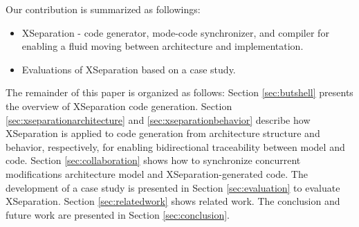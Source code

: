 %

%

%






%


Our contribution is summarized as followings:

\begin{itemize}
	\item XSeparation - code generator, mode-code synchronizer, and compiler for enabling a fluid moving between architecture and implementation.
	
	\item Evaluations of XSeparation based on a case study.
\end{itemize}

The remainder of this paper is organized as follows: Section \ref{sec:butshell} presents the overview of XSeparation code generation. 
Section \ref{sec:xseparationarchitecture} and \ref{sec:xseparationbehavior} describe how XSeparation is applied to code generation from architecture structure and behavior, respectively, for enabling bidirectional traceability between model and code. 
Section \ref{sec:collaboration} shows how to synchronize concurrent modifications architecture model and XSeparation-generated code.
The development of a case study is presented in Section \ref{sec:evaluation} to evaluate XSeparation. 
Section \ref{sec:relatedwork} shows related work. 
The conclusion and future work are presented in Section \ref{sec:conclusion}.

